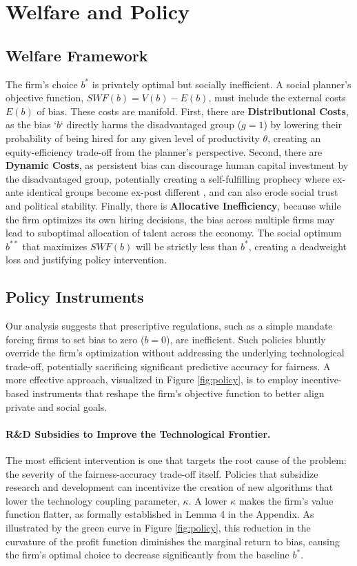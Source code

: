 \section{Welfare and Policy}

\subsection{Welfare Framework}
The firm's choice $b^*$ is privately optimal but socially inefficient. A social planner's objective function, $SWF(b) = V(b) - E(b)$, must include the external costs $E(b)$ of bias. These costs are manifold. First, there are \textbf{Distributional Costs}, as the bias `$b$` directly harms the disadvantaged group ($g=1$) by lowering their probability of being hired for any given level of productivity $\theta$, creating an equity-efficiency trade-off from the planner's perspective. Second, there are \textbf{Dynamic Costs}, as persistent bias can discourage human capital investment by the disadvantaged group, potentially creating a self-fulfilling prophecy where ex-ante identical groups become ex-post different \citep{Coate1993}, and can also erode social trust and political stability. Finally, there is \textbf{Allocative Inefficiency}, because while the firm optimizes its own hiring decisions, the bias across multiple firms may lead to suboptimal allocation of talent across the economy.
The social optimum $b^{**}$ that maximizes $SWF(b)$ will be strictly less than $b^*$, creating a deadweight loss and justifying policy intervention.

\subsection{Policy Instruments}

Our analysis suggests that prescriptive regulations, such as a simple mandate forcing firms to set bias to zero ($b=0$), are inefficient. Such policies bluntly override the firm's optimization without addressing the underlying technological trade-off, potentially sacrificing significant predictive accuracy for fairness. A more effective approach, visualized in Figure \ref{fig:policy}, is to employ incentive-based instruments that reshape the firm's objective function to better align private and social goals.

\paragraph{R\&D Subsidies to Improve the Technological Frontier.}
The most efficient intervention is one that targets the root cause of the problem: the severity of the fairness-accuracy trade-off itself. Policies that subsidize research and development can incentivize the creation of new algorithms that lower the technology coupling parameter, $\kappa$. A lower $\kappa$ makes the firm's value function flatter, as formally established in Lemma 4 in the Appendix. As illustrated by the green curve in Figure \ref{fig:policy}, this reduction in the curvature of the profit function diminishes the marginal return to bias, causing the firm's optimal choice to decrease significantly from the baseline $b^*$.

